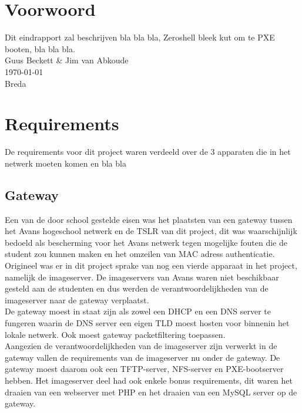 \documentclass[12pt]{article}
\begin{document}
\clearpage
\section*{Voorwoord}
Dit eindrapport zal beschrijven bla bla bla, Zeroshell bleek kut om te PXE booten, bla bla bla.
\\
Guus Beckett \& Jim van Abkoude \\
\today \\
Breda
\newpage
\tableofcontents
\newpage
{}
\section{Requirements}
De requirements voor dit project waren verdeeld over de 3 apparaten die in het netwerk moeten komen en bla bla
\subsection{Gateway} %
\label{sub:gateway}
Een van de door school gestelde eisen was het plaatsten van een gateway tussen het Avans hogeschool netwerk en de TSLR van dit project, dit was waarschijnlijk bedoeld als bescherming voor het Avans netwerk tegen mogelijke fouten die de student zou kunnen maken en het omzeilen van MAC adress authenticatie. Origineel was er in dit project sprake van nog een vierde apparaat in het project, namelijk de imageserver. De imageservers van Avans waren niet beschikbaar gesteld aan de studenten en dus werden de verantwoordelijkheden van de imageserver naar de gateway verplaatst.
\\De gateway moest in staat zijn als zowel een DHCP en een DNS server te fungeren waarin de DNS server een eigen TLD moest hosten voor binnenin het lokale netwerk. Ook moest gateway packetfiltering toepassen.
\\Aangezien de verantwoordelijkheden van de imageserver zijn verwerkt in de gateway vallen de requirements van de imageserver nu onder de gateway. De gateway moest daarom ook een TFTP-server, NFS-server en PXE-bootserver hebben. Het imageserver deel had ook enkele bonus requirements, dit waren het draaien van een webserver met PHP en het draaien van een MySQL server op de gateway.
\end{document}
